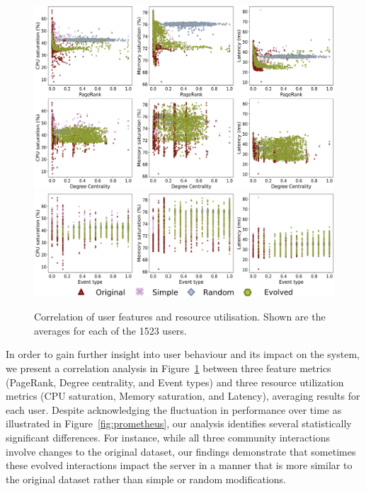\documentclass[dvipsnames,format=sigconf,anonymous=False,review=false, balance=false]{acmart}
\begin{document}
\begin{figure}
\centering%
\includegraphics[width=\linewidth,trim=0 0 0 0,clip]{corr1.png}\\
\includegraphics[width=\linewidth,trim=0 0 0 0,clip]{corr2.png}
\vspace{-5mm}
\caption{Correlation of user features and resource utilisation. Shown are the averages for each of the 1523 users.}
\label{fig:correlation}\vspace{-2mm}
\end{figure}

In order to gain further insight into user behaviour and its impact on the system, we present a correlation analysis in Figure~\ref{fig:correlation} between three feature metrics (PageRank, Degree centrality, and Event types) and three resource utilization metrics (CPU saturation, Memory saturation, and Latency), averaging results for each user. Despite acknowledging the fluctuation in performance over time as illustrated in Figure~\ref{fig:prometheus}, our analysis identifies several statistically significant differences.
For instance, while all three community interactions involve changes to the original dataset, our findings demonstrate that sometimes these evolved interactions impact the server in a manner that is more similar to the original dataset rather than simple or random modifications.
\end{document}
